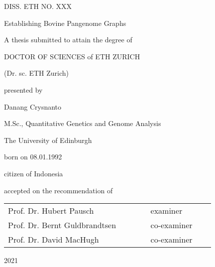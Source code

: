 \documentclass[../main.tex]{subfiles}
\begin{document}
\setlength{\parskip}{0pt}
\begin{center}
    \thispagestyle{empty}

    DISS. ETH NO. XXX 

    \vspace{1cm}

    \doublespacing
    
    {\LARGE Establishing Bovine Pangenome Graphs}

    \vspace{2cm}
    
    
    A thesis submitted to attain the degree of

    DOCTOR OF SCIENCES of ETH ZURICH

    (Dr. sc. ETH Zurich)
    \vspace{1cm}

    presented by

    \vspace{1cm}
    Danang Crysnanto  

    \vspace{1cm}

    M.Sc., Quantitative Genetics and Genome Analysis 
    
    The University of Edinburgh

    \vspace{1cm}

    born on 08.01.1992

    citizen of Indonesia

    \vspace{1.5cm}

    accepted on the recommendation of \\

        \begin{tabular}{ll}
        Prof. Dr. Hubert Pausch~ ~ ~ ~ ~ ~ ~ & examiner         \\
        Prof. Dr. Bernt Guldbrandtsen~ ~ ~ ~ & co-examiner~ ~~  \\
        Prof. Dr. David MacHugh~ ~ ~ ~ ~ ~ ~ & co-examiner     
        \end{tabular}


    \vspace{2cm}
    2021
\end{center}
\end{document}
